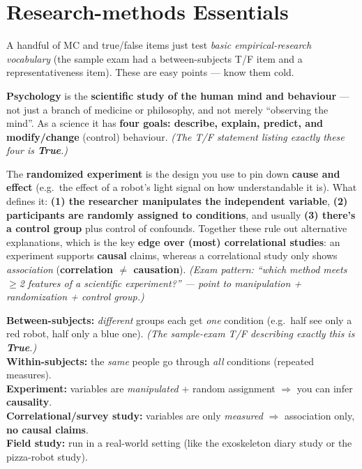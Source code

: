 \documentclass[11pt, oneside]{book}
\begin{document}
\chapter{Research-methods Essentials}

A handful of MC and true/false items just test \emph{basic
empirical-research vocabulary} (the sample exam had a between-subjects T/F item
and a representativeness item). These are easy points — know them cold.

\begin{defbox}[title={What psychology is, and its four goals}]
\textbf{Psychology} is the \textbf{scientific study of the human mind and
behaviour} — not just a branch of medicine or philosophy, and not merely
``observing the mind''. As a science it has \textbf{four goals: describe,
explain, predict, and modify/change} (control) behaviour. \emph{(The T/F
statement listing exactly these four is \textbf{True}.)}
\end{defbox}

\begin{defbox}[title={The scientific experiment vs.\ correlational studies}]
The \textbf{randomized experiment} is the design you use to pin down
\textbf{cause and effect} (e.g.\ the effect of a robot's light signal on how
understandable it is). What defines it: \textbf{(1) the researcher manipulates
the independent variable}, \textbf{(2) participants are randomly assigned to
conditions}, and usually \textbf{(3) there's a control group} plus control of
confounds. Together these rule out alternative explanations, which is the key
\textbf{edge over (most) correlational studies}: an experiment supports
\textbf{causal} claims, whereas a correlational study only shows
\emph{association} (\textbf{correlation $\ne$ causation}). \emph{(Exam pattern:
``which method meets $\ge$2 features of a scientific experiment?'' — point to
manipulation + randomization + control group.)}
\end{defbox}

\begin{defbox}[title={Study designs}]
\textbf{Between-subjects:} \emph{different} groups each get \emph{one}
condition (e.g.\ half see only a red robot, half only a blue one). \emph{(The
sample-exam T/F describing exactly this is \textbf{True}.)}\\
\textbf{Within-subjects:} the \emph{same} people go through \emph{all}
conditions (repeated measures).\\
\textbf{Experiment:} variables are \emph{manipulated} + random assignment
$\Rightarrow$ you can infer \textbf{causality}.\\
\textbf{Correlational/survey study:} variables are only \emph{measured}
$\Rightarrow$ association only, \textbf{no causal claims}.\\
\textbf{Field study:} run in a real-world setting (like the exoskeleton diary
study or the pizza-robot study).
\end{defbox}
\end{document}
